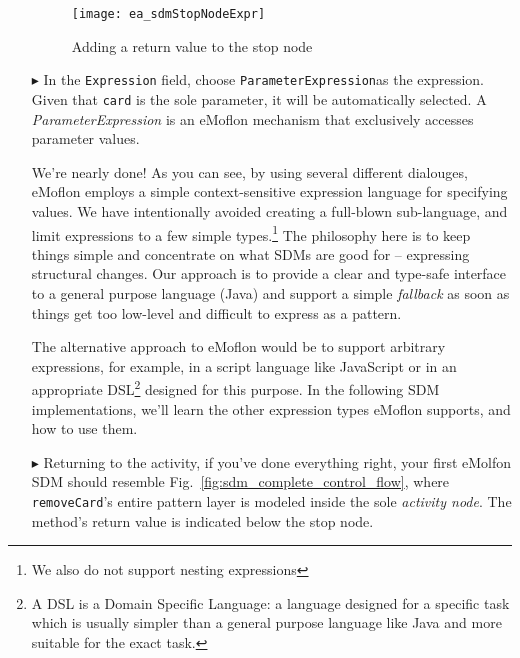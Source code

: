 \begin{itemize}
\begin{figure}[htbp]
\begin{center}
  \texttt{[image: ea\_sdmStopNodeExpr]}
  \caption{Adding a return value to the stop node}  
  \label{fig:stop_node_return_value}
\end{center}
\end{figure}

\item[$\blacktriangleright$] In the \texttt{Expression} field, choose \texttt{ParameterExpression}as the expression. Given that
\texttt{card} is the sole parameter, it will be automatically selected. A \emph{ParameterExpression} is an eMoflon mechanism that exclusively accesses parameter
values.

\vspace{0.5cm}

We're nearly done! As you can see, by using several different dialouges, eMoflon employs a simple context-sensitive expression language for specifying  values.
We have intentionally avoided creating a full-blown sub-language, and limit expressions to a few simple types.\footnote{We also do not support nesting expressions} The philosophy here is to keep things simple and concentrate on what SDMs are good for -- expressing structural changes. Our approach is to
provide a clear and type-safe interface to a general purpose language (Java) and support a simple \emph{fallback} as soon as things get too low-level and
difficult to express as a pattern.

\newpage

The alternative approach to eMoflon would be to support arbitrary expressions, for example, in a script language like JavaScript or in an appropriate
DSL\footnote{A DSL is a Domain Specific Language: a language designed for a specific task which is usually simpler than a general purpose language like Java and
more suitable for the exact task.} designed for this purpose. In the following SDM implementations, we'll learn the other expression types eMoflon supports,
and how to use them. 

\vspace{0.5cm}

\item[$\blacktriangleright$] Returning to the activity, if you've done everything right, your first eMolfon SDM should resemble
Fig.~\ref{fig:sdm_complete_control_flow}, where \texttt{removeCard}'s entire pattern layer is modeled inside the sole \emph{activity node}. The method's return value is indicated below the stop node.


\end{itemize}
